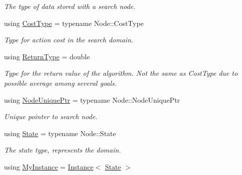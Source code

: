 \begin{DoxyCompactItemize}
\begin{DoxyCompactList}\small\item\em The type of data stored with a search node. \end{DoxyCompactList}\item 
using \hyperlink{structalgorithm_1_1BaseTraits_ac8df9cb2ac3a5f35e201bf1a26dceed9}{Cost\+Type} = typename Node\+::\+Cost\+Type\hypertarget{structalgorithm_1_1BaseTraits_ac8df9cb2ac3a5f35e201bf1a26dceed9}{}\label{structalgorithm_1_1BaseTraits_ac8df9cb2ac3a5f35e201bf1a26dceed9}

\begin{DoxyCompactList}\small\item\em Type for action cost in the search domain. \end{DoxyCompactList}\item 
using \hyperlink{structalgorithm_1_1BaseTraits_a4bfbea73f1059634690455ff7128843d}{Return\+Type} = double\hypertarget{structalgorithm_1_1BaseTraits_a4bfbea73f1059634690455ff7128843d}{}\label{structalgorithm_1_1BaseTraits_a4bfbea73f1059634690455ff7128843d}

\begin{DoxyCompactList}\small\item\em Type for the return value of the algorithm. Not the same as Cost\+Type due to possible average among several goals. \end{DoxyCompactList}\item 
using \hyperlink{structalgorithm_1_1BaseTraits_afad7192f72922bcd6289a2c8c43a0cbc}{Node\+Unique\+Ptr} = typename Node\+::\+Node\+Unique\+Ptr\hypertarget{structalgorithm_1_1BaseTraits_afad7192f72922bcd6289a2c8c43a0cbc}{}\label{structalgorithm_1_1BaseTraits_afad7192f72922bcd6289a2c8c43a0cbc}

\begin{DoxyCompactList}\small\item\em Unique pointer to search node. \end{DoxyCompactList}\item 
using \hyperlink{structalgorithm_1_1BaseTraits_aa61b1003453764d9ca52cb1087526ba4}{State} = typename Node\+::\+State\hypertarget{structalgorithm_1_1BaseTraits_aa61b1003453764d9ca52cb1087526ba4}{}\label{structalgorithm_1_1BaseTraits_aa61b1003453764d9ca52cb1087526ba4}

\begin{DoxyCompactList}\small\item\em The state type, represents the domain. \end{DoxyCompactList}\item 
using \hyperlink{structalgorithm_1_1BaseTraits_a38163af455fcd59619d980365d56a63f}{My\+Instance} = \hyperlink{structInstance}{Instance}$<$ \hyperlink{structalgorithm_1_1BaseTraits_aa61b1003453764d9ca52cb1087526ba4}{State} $>$\hypertarget{structalgorithm_1_1BaseTraits_a38163af455fcd59619d980365d56a63f}{}\label{structalgorithm_1_1BaseTraits_a38163af455fcd59619d980365d56a63f}


\end{DoxyCompactItemize}
